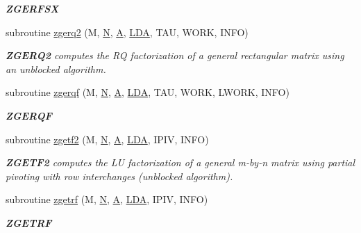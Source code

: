 \begin{DoxyCompactItemize}
\begin{DoxyCompactList}\small\item\em {\bfseries Z\+G\+E\+R\+F\+S\+X} \end{DoxyCompactList}\item 
subroutine \hyperlink{group__complex16GEcomputational_ga858d2144c2b5c76ed8a5340fcf793a83}{zgerq2} (M, \hyperlink{polmisc_8c_a0240ac851181b84ac374872dc5434ee4}{N}, \hyperlink{classA}{A}, \hyperlink{example__user_8c_ae946da542ce0db94dced19b2ecefd1aa}{L\+D\+A}, T\+A\+U, W\+O\+R\+K, I\+N\+F\+O)
\begin{DoxyCompactList}\small\item\em {\bfseries Z\+G\+E\+R\+Q2} computes the R\+Q factorization of a general rectangular matrix using an unblocked algorithm. \end{DoxyCompactList}\item 
subroutine \hyperlink{group__complex16GEcomputational_ga4be039758e15ce6dfd29e36d63a01ad7}{zgerqf} (M, \hyperlink{polmisc_8c_a0240ac851181b84ac374872dc5434ee4}{N}, \hyperlink{classA}{A}, \hyperlink{example__user_8c_ae946da542ce0db94dced19b2ecefd1aa}{L\+D\+A}, T\+A\+U, W\+O\+R\+K, L\+W\+O\+R\+K, I\+N\+F\+O)
\begin{DoxyCompactList}\small\item\em {\bfseries Z\+G\+E\+R\+Q\+F} \end{DoxyCompactList}\item 
subroutine \hyperlink{group__complex16GEcomputational_gaf3c2645d2b9b3d3bc26fcd9ad463cd5e}{zgetf2} (M, \hyperlink{polmisc_8c_a0240ac851181b84ac374872dc5434ee4}{N}, \hyperlink{classA}{A}, \hyperlink{example__user_8c_ae946da542ce0db94dced19b2ecefd1aa}{L\+D\+A}, I\+P\+I\+V, I\+N\+F\+O)
\begin{DoxyCompactList}\small\item\em {\bfseries Z\+G\+E\+T\+F2} computes the L\+U factorization of a general m-\/by-\/n matrix using partial pivoting with row interchanges (unblocked algorithm). \end{DoxyCompactList}\item 
subroutine \hyperlink{group__complex16GEcomputational_ga5b625680e6251feb29e386193914981c}{zgetrf} (M, \hyperlink{polmisc_8c_a0240ac851181b84ac374872dc5434ee4}{N}, \hyperlink{classA}{A}, \hyperlink{example__user_8c_ae946da542ce0db94dced19b2ecefd1aa}{L\+D\+A}, I\+P\+I\+V, I\+N\+F\+O)
\begin{DoxyCompactList}\small\item\em {\bfseries Z\+G\+E\+T\+R\+F} \end{DoxyCompactList}\item 

\end{DoxyCompactItemize}
